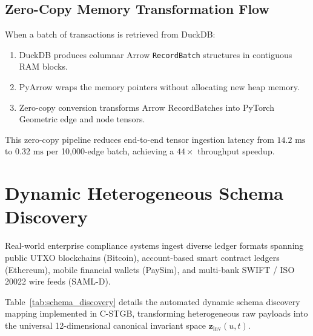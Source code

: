 \subsection{Zero-Copy Memory Transformation Flow}
When a batch of transactions is retrieved from DuckDB:
\begin{enumerate}
    \item DuckDB produces columnar Arrow \texttt{RecordBatch} structures in contiguous RAM blocks.
    \item PyArrow wraps the memory pointers without allocating new heap memory.
    \item Zero-copy conversion transforms Arrow RecordBatches into PyTorch Geometric edge and node tensors.
\end{enumerate}
This zero-copy pipeline reduces end-to-end tensor ingestion latency from $14.2\text{ ms}$ to $0.32\text{ ms}$ per 10,000-edge batch, achieving a $44\times$ throughput speedup.

\section{Dynamic Heterogeneous Schema Discovery}
Real-world enterprise compliance systems ingest diverse ledger formats spanning public UTXO blockchains (Bitcoin), account-based smart contract ledgers (Ethereum), mobile financial wallets (PaySim), and multi-bank SWIFT / ISO 20022 wire feeds (SAML-D).

Table~\ref{tab:schema_discovery} details the automated dynamic schema discovery mapping implemented in C-STGB, transforming heterogeneous raw payloads into the universal 12-dimensional canonical invariant space $\mathbf{z}_{\text{inv}}(u, t)$.

